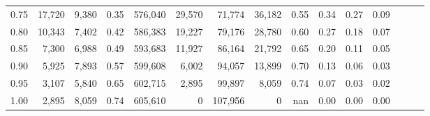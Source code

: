 \begin{tabular}{rrrrrrrrrrrrrrr}
0.75 &  17,720 &  9,380 &  0.35 &  576,040 &   29,570 &   71,774 &   36,182 &  0.55 &  0.34 &  0.27 &      0.09 \\
0.80 &  10,343 &  7,402 &  0.42 &  586,383 &   19,227 &   79,176 &   28,780 &  0.60 &  0.27 &  0.18 &      0.07 \\
0.85 &   7,300 &  6,988 &  0.49 &  593,683 &   11,927 &   86,164 &   21,792 &  0.65 &  0.20 &  0.11 &      0.05 \\
0.90 &   5,925 &  7,893 &  0.57 &  599,608 &    6,002 &   94,057 &   13,899 &  0.70 &  0.13 &  0.06 &      0.03 \\
0.95 &   3,107 &  5,840 &  0.65 &  602,715 &    2,895 &   99,897 &    8,059 &  0.74 &  0.07 &  0.03 &      0.02 \\
1.00 &   2,895 &  8,059 &  0.74 &  605,610 &        0 &  107,956 &        0 &   nan &  0.00 &  0.00 &      0.00 \\
\bottomrule
\end{tabular}
